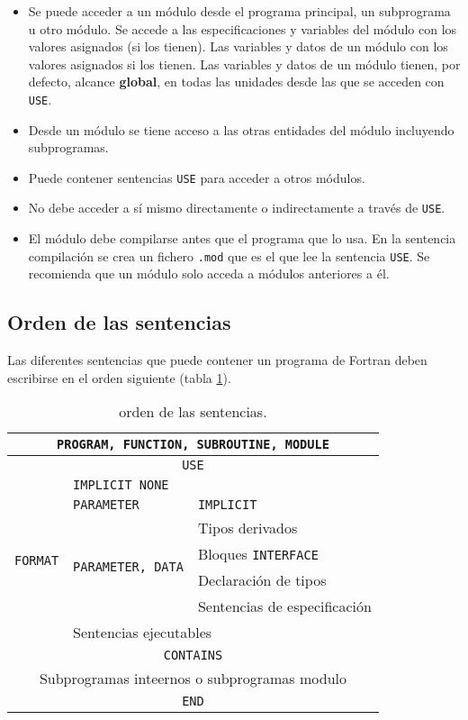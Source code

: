 \begin{itemize}
	\item Se puede acceder a un módulo desde el programa principal, un subprograma u otro módulo. Se accede a las especificaciones y variables del módulo con los valores asignados (si los tienen). Las variables y datos de un módulo con los valores asignados si los tienen. Las variables y datos de un módulo tienen, por defecto, alcance {\bf global}, en todas las unidades desde las que se acceden con {\tt USE}.
	\item Desde un módulo se tiene acceso a las otras entidades del módulo incluyendo subprogramas. 
	\item Puede contener sentencias {\tt USE} para acceder a otros módulos.
	\item No debe acceder a sí mismo directamente o indirectamente a través de {\tt USE}.
	\item El módulo debe compilarse antes que el programa que lo usa. En la sentencia compilación se crea un fichero {\tt *.mod} que es el que lee la sentencia {\tt USE}. Se recomienda que un módulo solo acceda a módulos anteriores a él.
\end{itemize}


\subsection{Orden de las sentencias}

Las diferentes sentencias que puede contener un programa de Fortran deben escribirse en el orden siguiente (tabla \ref{Tab:01-01}).

\begin{table}[h!] \centering
	\begin{tabular}{|l|l|l|} \hline
		\multicolumn{3}{|c|}{{\tt PROGRAM, FUNCTION, SUBROUTINE, MODULE}} \\ \hline
		\multicolumn{3}{|c|}{\texttt{USE}} \\ \hline
		\multirow{7}{*}{\texttt{FORMAT}} & \multicolumn{2}{l|}{\texttt{IMPLICIT NONE}}\\  \cline{2-3}
		 & \texttt{PARAMETER} & \texttt{IMPLICIT} \\  \cline{2-3}
		 & \multirow{4}{*}{\texttt{PARAMETER, DATA}} & Tipos derivados \\
		 &  & Bloques \texttt{INTERFACE} \\
		 &  & Declaración de tipos\\ 
		 &  & Sentencias de especificación \\  \cline{2-3}
		 &  \multicolumn{2}{l|}{Sentencias ejecutables}  \\ \hline
		\multicolumn{3}{|c|}{\texttt{CONTAINS}} \\ \hline
		\multicolumn{3}{|c|}{Subprogramas inteernos o subprogramas modulo} \\ \hline
		\multicolumn{3}{|c|}{\texttt{END}} \\ \hline
	\end{tabular}
	\caption{orden de las sentencias.}
	\label{Tab:01-01}
\end{table}

